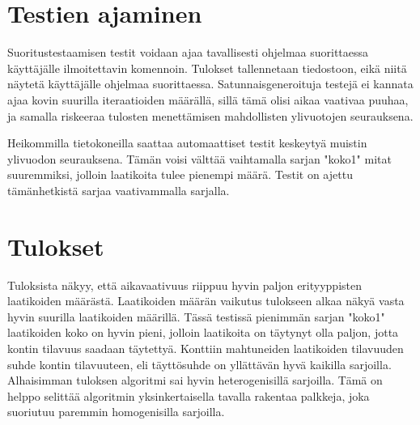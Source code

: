 \documentclass[a4paper,12pt, titlepage]{article}
\begin{document}
\section*{Testien ajaminen}
Suoritustestaamisen testit voidaan ajaa tavallisesti ohjelmaa suorittaessa käyttäjälle ilmoitettavin komennoin. Tulokset tallennetaan tiedostoon, eikä niitä näytetä käyttäjälle ohjelmaa suorittaessa. Satunnaisgeneroituja testejä ei kannata ajaa kovin suurilla iteraatioiden määrällä, sillä tämä olisi aikaa vaativaa puuhaa, ja samalla riskeeraa tulosten menettämisen mahdollisten ylivuotojen seurauksena. 

Heikommilla tietokoneilla saattaa automaattiset testit keskeytyä muistin ylivuodon seurauksena. Tämän voisi välttää vaihtamalla sarjan "koko1" mitat suuremmiksi, jolloin laatikoita tulee pienempi määrä. Testit on ajettu tämänhetkistä sarjaa vaativammalla sarjalla.

\section*{Tulokset}
Tuloksista näkyy, että aikavaativuus riippuu hyvin paljon erityyppisten laatikoiden määrästä. Laatikoiden määrän vaikutus tulokseen alkaa näkyä vasta hyvin suurilla laatikoiden määrillä. Tässä testissä pienimmän sarjan "koko1" laatikoiden koko on hyvin pieni, jolloin laatikoita on täytynyt olla paljon, jotta kontin tilavuus saadaan täytettyä. Konttiin mahtuneiden laatikoiden tilavuuden suhde kontin tilavuuteen, eli täyttösuhde on yllättävän hyvä kaikilla sarjoilla. Alhaisimman tuloksen algoritmi sai hyvin heterogenisillä sarjoilla. Tämä on helppo selittää algoritmin yksinkertaisella tavalla rakentaa palkkeja, joka suoriutuu paremmin homogenisilla sarjoilla.
\end{document}
